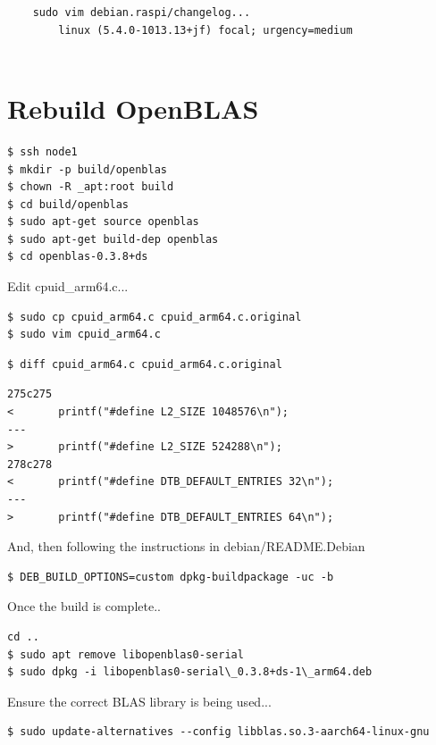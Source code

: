 \documentclass{report}
\begin{document}
\begin{verbatim}
    sudo vim debian.raspi/changelog...
        linux (5.4.0-1013.13+jf) focal; urgency=medium
        
\end{verbatim}


%
%
\chapter{Rebuild OpenBLAS}

\lstset{style=type}
\begin{lstlisting}
$ ssh node1
$ mkdir -p build/openblas
$ chown -R _apt:root build
$ cd build/openblas
$ sudo apt-get source openblas
$ sudo apt-get build-dep openblas
$ cd openblas-0.3.8+ds
\end{lstlisting}


Edit cpuid\_arm64.c...

\lstset{style=type}
\begin{lstlisting}
$ sudo cp cpuid_arm64.c cpuid_arm64.c.original
$ sudo vim cpuid_arm64.c
\end{lstlisting}


\lstset{style=type}
\begin{lstlisting}
$ diff cpuid_arm64.c cpuid_arm64.c.original
\end{lstlisting}

\lstset{style=type}
\begin{lstlisting}
275c275
<       printf("#define L2_SIZE 1048576\n");
---
>       printf("#define L2_SIZE 524288\n");
278c278
<       printf("#define DTB_DEFAULT_ENTRIES 32\n");
---
>       printf("#define DTB_DEFAULT_ENTRIES 64\n");
\end{lstlisting}


And, then following the instructions in debian/README.Debian

\lstset{style=type}
\begin{lstlisting}
$ DEB_BUILD_OPTIONS=custom dpkg-buildpackage -uc -b
\end{lstlisting}

Once the build is complete..

\lstset{style=type}
\begin{lstlisting}
cd ..
$ sudo apt remove libopenblas0-serial
$ sudo dpkg -i libopenblas0-serial\_0.3.8+ds-1\_arm64.deb
\end{lstlisting}

Ensure the correct BLAS library is being used...

\lstset{style=type}
\begin{lstlisting}
$ sudo update-alternatives --config libblas.so.3-aarch64-linux-gnu
\end{lstlisting}
\end{document}
